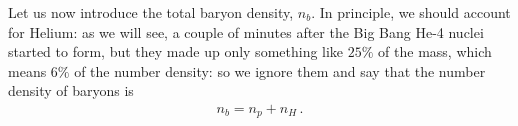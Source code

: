 \documentclass[main.tex]{subfiles}
\begin{document}









Let us now introduce the total baryon density, \(n_b\).
In principle, we should account for Helium: as we will see, a couple of minutes after the Big Bang He-4 nuclei started to form, but they made up only something like \(25\%\) of the mass, which means \(6\%\) of the number density: so we ignore them and say that the number density of baryons is 
%
\begin{align}
  n_b = n_p + n_H
\,.
\end{align}

\end{document}
